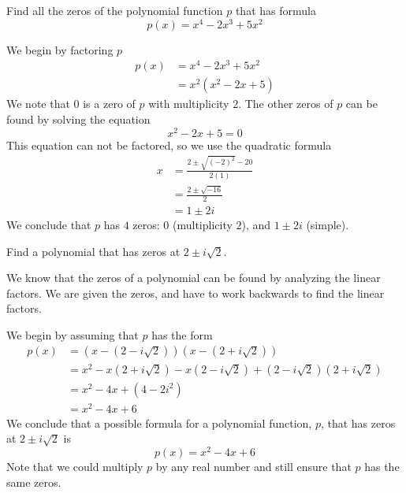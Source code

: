 	 \begin{pccexample}
		 Find all the zeros of the polynomial function $p$ that has formula
		 \[
			 p(x)=x^4-2x^3+5x^2
		 \]
		 \begin{pccsolution}
			 We begin by factoring $p$
			 \begin{align*}
				 p(x) & =x^4-2x^3+5x^2 \\
				      & =x^2(x^2-2x+5)
			 \end{align*}
			 We note that $0$ is a zero of $p$ with multiplicity $2$. The other zeros of $p$
			 can be found by solving the equation
			 \[
				 x^2-2x+5=0
			 \]
			 This equation can not be factored, so we use the quadratic formula
			 \begin{align*}
				 x & =\frac{2\pm\sqrt{(-2)^2}-20}{2(1)} \\
				   & =\frac{2\pm\sqrt{-16}}{2}          \\
				   & =1\pm 2i
			 \end{align*}
			 We conclude that $p$ has $4$ zeros: $0$ (multiplicity $2$), and $1\pm 2i$ (simple).
		 \end{pccsolution}
	 \end{pccexample}
	 \begin{pccexample}
		 Find a polynomial that has zeros at $2\pm i\sqrt{2}$.
		 \begin{pccsolution}
			 We know that the zeros of a polynomial can be found by analyzing the linear
			 factors. We are given the zeros, and have to work backwards to find the
			 linear factors.

			 We begin by assuming that $p$ has the form
			 \begin{align*}
				 p(x) & =(x-(2-i\sqrt{2}))(x-(2+i\sqrt{2}))                           \\
				      & =x^2-x(2+i\sqrt{2})-x(2-i\sqrt{2})+(2-i\sqrt{2})(2+i\sqrt{2}) \\
				      & =x^2-4x+(4-2i^2)                                              \\
				      & =x^2-4x+6
			 \end{align*}
			 We conclude that a possible formula for a polynomial function, $p$,
			 that has zeros at $2\pm i\sqrt{2}$ is
			 \[
				 p(x)=x^2-4x+6
			 \]
			 Note that we could multiply $p$ by any real number and still ensure
			 that $p$ has the same zeros.
		 \end{pccsolution}
	 \end{pccexample}

